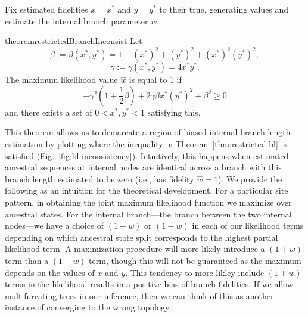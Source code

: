 \documentclass[11pt]{article}
\begin{document}
Fix estimated fidelities $x=x^*$ and $y=y^*$ to their true, generating values and estimate the internal branch parameter $w$.
\begin{restatable}{theorem}{restrictedBranchInconsist}
\label{thm:restricted-bl}
Let
\[
\beta := \beta(x^*, y^*) = 1+(x^*)^2+(y^*)^2+(x^*)^2(y^*)^2,
\]
\[
\gamma := \gamma(x^*, y^*) = 4x^*y^*.
\]
The maximum likelihood value $\hat{w}$ is equal to 1 if
\[
-\gamma^2\left(1 + \frac{1}{2}\beta\right) + 2\gamma\beta x^*(y^*)^2 + \beta^2 \ge 0
\]
and there exists a set of $0 < x^*, y^* < 1$ satisfying this.
\end{restatable}
This theorem allows us to demarcate a region of biased internal branch length estimation by plotting where the inequality in Theorem~\ref{thm:restricted-bl} is satisfied (Fig.~\ref{fig:bl-inconsistency}).
Intuitively, this happens when estimated ancestral sequences at internal nodes are identical across a branch with this branch length estimated to be zero (i.e., has fidelity $\hat{w} = 1$).
We provide the following as an intuition for the theoretical development.
For a particular site pattern, in obtaining the joint maximum likelihood function we maximize over ancestral states.
For the internal branch---the branch between the two internal nodes---we have a choice of $(1+w)$ or $(1-w)$ in each of our likelihood terms depending on which ancestral state split corresponds to the highest partial likelihood term.
A maximization procedure will more likely introduce a $(1+w)$ term than a $(1-w)$ term, though this will not be guaranteed as the maximum depends on the values of $x$ and $y$.
This tendency to more likley include $(1+w)$ terms in the likelihood results in a positive bias of branch fidelities.
If we allow multifurcating trees in our inference, then we can think of this as another instance of converging to the wrong topology.
\end{document}
